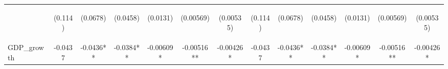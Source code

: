 \documentclass[]{article}
\begin{document}
\begin{center}
\begin{tabular}{lcccccccccccc}
\vspace{4pt} & \begin{footnotesize}(0.114)\end{footnotesize} & \begin{footnotesize}(0.0678)\end{footnotesize} & \begin{footnotesize}(0.0458)\end{footnotesize} & \begin{footnotesize}(0.0131)\end{footnotesize} & \begin{footnotesize}(0.00569)\end{footnotesize} & \begin{footnotesize}(0.00535)\end{footnotesize} & \begin{footnotesize}(0.114)\end{footnotesize} & \begin{footnotesize}(0.0678)\end{footnotesize} & \begin{footnotesize}(0.0458)\end{footnotesize} & \begin{footnotesize}(0.0131)\end{footnotesize} & \begin{footnotesize}(0.00569)\end{footnotesize} & \begin{footnotesize}(0.00535)\end{footnotesize} \\
GDP\_growth & -0.0437 & -0.0436** & -0.0384** & -0.00609* & -0.00516** & -0.00426* & -0.0437 & -0.0436** & -0.0384** & -0.00609* & -0.00516** & -0.00426* \\

\end{tabular}
\end{center}
\end{document}
